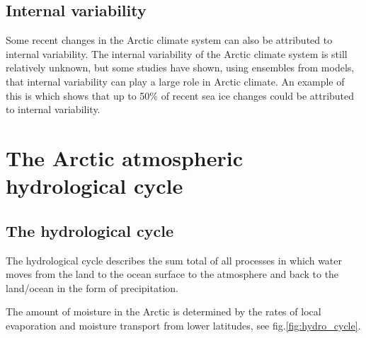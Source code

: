 \documentclass[12pt, oneside]{article}
\begin{document}
\subsection{Internal variability}
Some recent changes in the Arctic climate system can also be attributed to internal variability. The internal variability of the Arctic climate system is still relatively unknown, but some studies have shown, using ensembles from models, that internal variability can play a large role in Arctic climate. An example of this is\cite{ding2019fingerprints} which shows that up to 50\% of recent sea ice changes could be attributed to internal variability. 


\section{The Arctic atmospheric hydrological cycle}\label{the cycle}




\subsection{The hydrological cycle}
The hydrological cycle describes the sum total of all processes in which water moves from the land to the ocean surface to the atmosphere and back to the land/ocean in the form of precipitation\cite{CHAKRAVARTY2019203}. 

The amount of moisture in the Arctic is determined by the rates of local evaporation and moisture transport from lower latitudes, see fig.\ref{fig:hydro_cycle}. 
\end{document}
